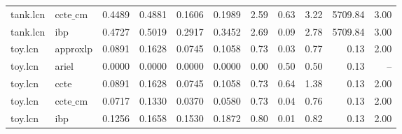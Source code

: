 \begin{table}[ht]
\begin{tabular}{llrrrrrrrrr}
tank.lcn & $\text{ccte\_cm}$ & 0.4489 & 0.4881 & 0.1606 & 0.1989 & 2.59 & 0.63 & 3.22 & 5709.84 & 3.00 \\
tank.lcn & ibp & 0.4727 & 0.5019 & 0.2917 & 0.3452 & 2.69 & 0.09 & 2.78 & 5709.84 & 3.00 \\
toy.lcn & approxlp & 0.0891 & 0.1628 & 0.0745 & 0.1058 & 0.73 & 0.03 & 0.77 & 0.13 & 2.00 \\
toy.lcn & ariel & 0.0000 & 0.0000 & 0.0000 & 0.0000 & 0.00 & 0.50 & 0.50 & 0.13 & -- \\
toy.lcn & ccte & 0.0891 & 0.1628 & 0.0745 & 0.1058 & 0.73 & 0.64 & 1.38 & 0.13 & 2.00 \\
toy.lcn & $\text{ccte\_cm}$ & 0.0717 & 0.1330 & 0.0370 & 0.0580 & 0.73 & 0.04 & 0.76 & 0.13 & 2.00 \\
toy.lcn & ibp & 0.1256 & 0.1658 & 0.1530 & 0.1872 & 0.80 & 0.01 & 0.82 & 0.13 & 2.00 \\
\bottomrule
\end{tabular}
\end{table}
